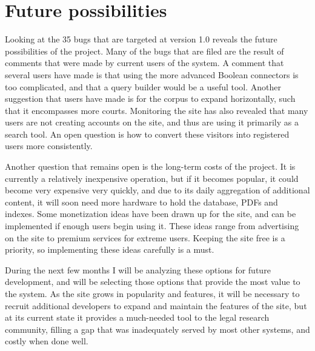 \label{future}
\section{Future possibilities}
Looking at the 35 bugs that are targeted at version 1.0 reveals the future possibilities of the project. Many of the bugs that are filed are the result of comments that were made by current users of the system. A comment that several users have made is that using the more advanced Boolean connectors is too complicated, and that a query builder would be a useful tool. Another suggestion that users have made is for the corpus to expand horizontally, such that it encompasses more courts. Monitoring the site has also revealed that many users are not creating accounts on the site, and thus are using it primarily as a search tool. An open question is how to convert these visitors into registered users more consistently. 

Another question that remains open is the long-term costs of the project. It is currently a relatively inexpensive operation, but if it becomes popular, it could become very expensive very quickly, and due to its daily aggregation of additional content, it will soon need more hardware to hold the database, PDFs and indexes. Some monetization ideas have been drawn up for the site, and can be implemented if enough users begin using it. These ideas range from advertising on the site to premium services for extreme users. Keeping the site free is a priority, so implementing these ideas carefully is a must.

During the next few months I will be analyzing these options for future development, and will be selecting those options that provide the most value to the system. As the site grows in popularity and features, it will be necessary to recruit additional developers to expand and maintain the features of the site, but at its current state it provides a much-needed tool to the legal research community, filling a gap that was inadequately served by most other systems, and costly when done well.
